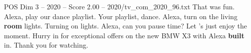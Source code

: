 \begin{textsample}{POS Dim 3 – 2020 – Score 2.00 – 2020/tv\_com\_2020\_96.txt}  \label{ex:f3_pos_064}
That was fun.
Alexa, play our dance playlist.
Your playlist, dance.
Alexa, turn on the living \textbf{room} lights.
Turning on lights.
Alexa, can you pause time?
Let 's just enjoy the moment.
Hurry in for exceptional offers on the new BMW X3 with Alexa \textbf{built} in.
Thank you for watching.

\end{textsample}
